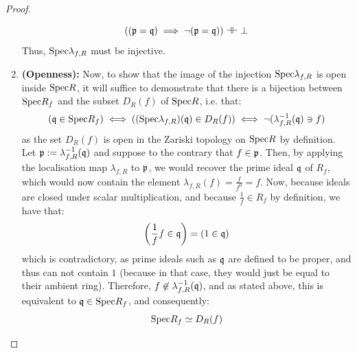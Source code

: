 \begin{proof}
\begin{enumerate}
                                        $$\left( (\mathfrak{p} = \mathfrak{q}) \implies \neg(\mathfrak{p} = \mathfrak{q}) \right) \dashv\vdash \bot$$
                                    Thus, $\mathrm{Spec} \lambda_{f, R}$ must be injective.
                                    \item \textbf{(Openness):} Now, to show that the image of the injection $\mathrm{Spec} \lambda_{f, R}$ is open inside $\mathrm{Spec} R$, it will suffice to demonstrate that there is a bijection between $\mathrm{Spec} R_f$ and the subset $D_R(f)$ of $\mathrm{Spec} R$, i.e. that:
                                        $$(\mathfrak{q} \in \mathrm{Spec} R_f) \iff \left( (\mathrm{Spec} \lambda_{f, R})(\mathfrak{q}) \in D_R(f) \right) \iff \neg(\lambda_{f, R}^{-1}(\mathfrak{q}) \ni f)$$
                                    as the set $D_R(f)$ is open in the Zariski topology on $\mathrm{Spec} R$ by definition. Let $\mathfrak{p} := \lambda_{f, R}^{-1}(\mathfrak{q})$ and suppose to the contrary that $f \in \mathfrak{p}$. Then, by applying the localisation map $\lambda_{f, R}$ to $\mathfrak{p}$, we would recover the prime ideal $\mathfrak{q}$ of $R_f$, which would now contain the element $\lambda_{f, R}(f) = \frac{f}{f^0} = f$. Now, because ideals are closed under scalar multiplication, and because $\frac1f \in R_f$ by definition, we have that:
                                        $$\left( \frac1f f \in \mathfrak{q} \right) = (1 \in \mathfrak{q})$$
                                    which is contradictory, as prime ideals such as $\mathfrak{q}$ are defined to be proper, and thus can not contain $1$ (because in that case, they would just be equal to their ambient ring). Therefore, $f \not \in \lambda_{f, R}^{-1}(\mathfrak{q})$, and as stated above, this is equivalent to $\mathfrak{q} \in \mathrm{Spec} R_f$, and consequently:
                                        $$\mathrm{Spec} R_f \simeq D_R(f)$$
                                \end{enumerate}
                        \end{proof}
                        

